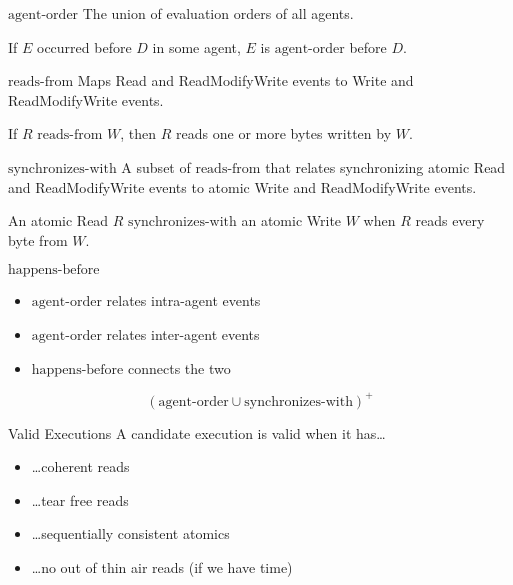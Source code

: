 \documentclass{beamer}
\begin{document}
\begin{frame}{$\textrm{agent-order}$}
  The union of evaluation orders of all agents.

  \begin{center}
    If $E$ occurred before $D$ in some agent, $E$ is $\textrm{agent-order}$ before $D$.
  \end{center}
\end{frame}

\begin{frame}{$\textrm{reads-from}$}
  Maps Read and ReadModifyWrite events to Write and ReadModifyWrite events.

  \begin{center}
    If $R$ $\textrm{reads-from}$ $W$, then $R$ reads one or more bytes written by $W$.
  \end{center}
\end{frame}

\begin{frame}{$\textrm{synchronizes-with}$}
  A subset of $\textrm{reads-from}$ that relates synchronizing atomic Read and ReadModifyWrite events to atomic Write and ReadModifyWrite events.

  \begin{center}
    An atomic Read $R$ $\textrm{synchronizes-with}$ an atomic Write $W$ when $R$ reads every byte from $W$.
  \end{center}

\end{frame}

\begin{frame}{$\textrm{happens-before}$}
  \begin{itemize}
  \item $\textrm{agent-order}$ relates intra-agent events
  \item $\textrm{agent-order}$ relates inter-agent events
  \item $\textrm{happens-before}$ connects the two
  \end{itemize}

  $$(\textrm{agent-order} \cup \textrm{synchronizes-with})^{+}$$
\end{frame}

\begin{frame}{Valid Executions}
  A candidate execution is valid when it has\ldots

  \begin{itemize}
  \item \ldots coherent reads
  \item \ldots tear free reads
  \item \ldots sequentially consistent atomics
  \item \ldots no out of thin air reads (if we have time)
  \end{itemize}
\end{frame}
\end{document}
